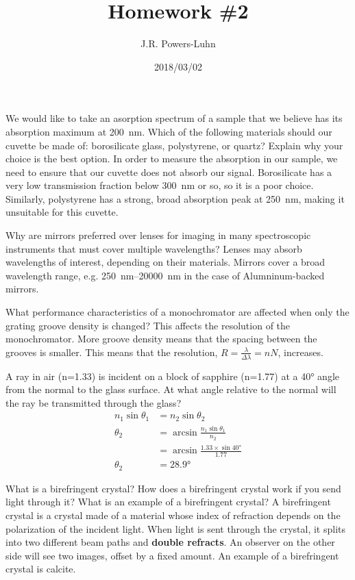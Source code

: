 \documentclass{hw}
\author{J.R. Powers-Luhn}
\date{2018/03/02}
\title{Homework \#2}
\begin{document}

\problem{}
	We would like to take an asorption spectrum of a sample that we believe has its absorption maximum at \SI{200}{\nano\meter}. Which of the following materials should our cuvette be made of: borosilicate glass, polystyrene, or quartz? Explain why your choice is the best option.
\solution
    In order to measure the absorption in our sample, we need to ensure that our cuvette does not absorb our signal. Borosilicate has a very low transmission fraction below \SI{300}{\nano\meter} or so, so it is a poor choice. Similarly, polystyrene has a strong, broad absorption peak at \SI{250}{\nano\meter}, making it unsuitable for this cuvette.

\problem{}
    Why are mirrors preferred over lenses for imaging in many spectroscopic instruments that must cover multiple wavelengths?
\solution
    Lenses may absorb wavelengths of interest, depending on their materials. Mirrors cover a broad wavelength range, e.g. \SIrange[scientific-notation = engineering]{250}{20000}{\nano\meter} in the case of Alumninum-backed mirrors.

\problem{}
    What performance characteristics of a monochromator are affected when only the grating groove density is changed?
\solution
    This affects the resolution of the monochromator. More groove density means that the spacing between the grooves is smaller. This means that the resolution, $R = \frac{\lambda}{\Delta \lambda} = n N$, increases.

\problem{}
    A ray in air (n=\num{1.33}) is incident on a block of sapphire (n=\num{1.77}) at a \ang{40} angle from the normal to the glass surface. At what angle relative to the normal will the ray be transmitted through the glass?
\solution
    \begin{align*}
        n_1 \sin \theta_1 &= n_2 \sin \theta_2 \\
        \theta_2 &= \arcsin \frac{n_1 \sin \theta_1}{n_2} \\
        &= \arcsin \frac{\num{1.33} \times \sin \ang{40}}{\num{1.77}} \\
        \theta_2 &= \ang{28.9}
    \end{align*}

\problem{}
    What is a birefringent crystal? How does a birefringent crystal work if you send light through it? What is an example of a birefringent crystal?
\solution
    A birefringent crystal is a crystal made of a material whose index of refraction depends on the polarization of the incident light. When light is sent through the crystal, it splits into two different beam paths and \textbf{double refracts}. An observer on the other side will see two images, offset by a fixed amount. An example of a birefringent crystal is calcite.
\end{document}
